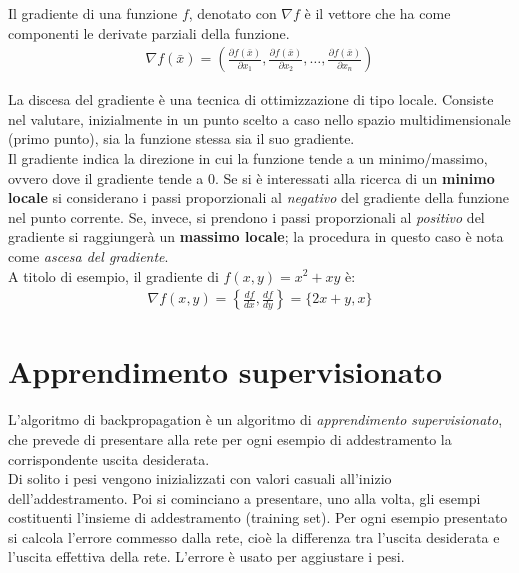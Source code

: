 Il gradiente di una funzione $f$, denotato con $\nabla f$ è il vettore che ha come componenti le derivate parziali della funzione.
\begin{align}
	\nabla f(\bar{x}) = \left( \frac{\partial f(\bar{x})}{\partial x_1}, \frac{\partial f(\bar{x})}{\partial x_2}, \dots, \frac{\partial f(\bar{x})}{\partial x_n} \right)
\end{align}

La discesa del gradiente è una tecnica di ottimizzazione di tipo locale. Consiste nel valutare, inizialmente in un punto scelto a caso nello spazio multidimensionale (primo punto), sia la funzione stessa sia il suo gradiente.\\

Il gradiente indica la direzione in cui la funzione tende a un minimo/massimo, ovvero dove il gradiente tende a 0. Se si è interessati alla ricerca di un \textbf{minimo locale} si considerano i passi proporzionali al \emph{negativo} del gradiente della funzione nel punto corrente. Se, invece, si prendono i passi proporzionali al \emph{positivo} del gradiente si raggiungerà un \textbf{massimo locale}; la procedura in questo caso è nota come \emph{ascesa del gradiente}.\\

A titolo di esempio, il gradiente di $f(x, y) = x^2 + xy$ è:
\begin{align*}
	\nabla f(x, y) = \left\{\frac{df}{dx}, \frac{df}{dy} \right\} = \{2x + y, x\}
\end{align*}



\section{Apprendimento supervisionato} %
\label{sec:apprendimento_supervisionato}
L'algoritmo di backpropagation è un algoritmo di \emph{apprendimento supervisionato}, che prevede di presentare alla rete per ogni esempio di addestramento la corrispondente uscita desiderata.\\

Di solito i pesi vengono inizializzati con valori casuali all’inizio dell’addestramento. Poi si cominciano a presentare, uno alla volta, gli esempi costituenti l’insieme di addestramento (training set). Per ogni esempio presentato si calcola l’errore commesso dalla rete, cioè la differenza tra l’uscita desiderata e l’uscita effettiva della rete. L’errore è usato per aggiustare i pesi.\\

